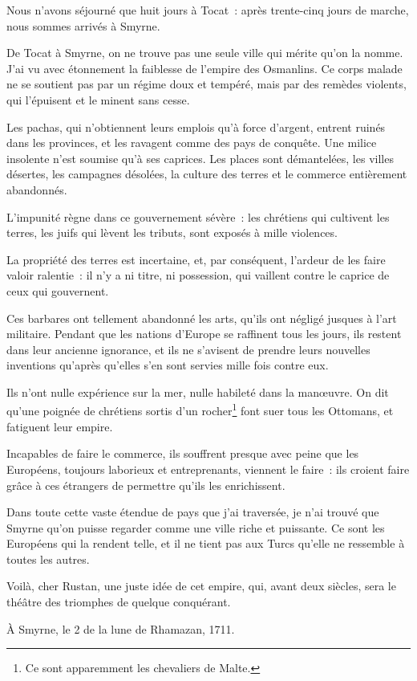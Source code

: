 \documentclass[french,twoside]{book} %
\begin{document}
\noindent Nous n’avons séjourné que huit jours à Tocat : après trente-cinq jours de marche, nous sommes arrivés à Smyrne.\par
De Tocat à Smyrne, on ne trouve pas une seule ville qui mérite qu’on la nomme. J’ai vu avec étonnement la faiblesse de l’empire des Osmanlins. Ce corps malade ne se soutient pas par un régime doux et tempéré, mais par des remèdes violents, qui l’épuisent et le minent sans cesse.\par
Les pachas, qui n’obtiennent leurs emplois qu’à force d’argent, entrent ruinés dans les provinces, et les ravagent comme des pays de conquête. Une milice insolente n’est soumise qu’à ses caprices. Les places sont démantelées, les villes désertes, les campagnes désolées, la culture des terres et le commerce entièrement abandonnés.\par
L’impunité règne dans ce gouvernement sévère : les chrétiens qui cultivent les terres, les juifs qui lèvent les tributs, sont exposés à mille violences.\par
La propriété des terres est incertaine, et, par conséquent, l’ardeur de les faire valoir ralentie : il n’y a ni titre, ni possession, qui vaillent contre le caprice de ceux qui gouvernent.\par
Ces barbares ont tellement abandonné les arts, qu’ils ont négligé jusques à l’art militaire. Pendant que les nations d’Europe se raffinent tous les jours, ils restent dans leur ancienne ignorance, et ils ne s’avisent de prendre leurs nouvelles inventions qu’après qu’elles s’en sont servies mille fois contre eux.\par
Ils n’ont nulle expérience sur la mer, nulle habileté dans la manœuvre. On dit qu’une poignée de chrétiens sortis d’un rocher\footnote{Ce sont apparemment les chevaliers de Malte.} font suer tous les Ottomans, et fatiguent leur empire.\par
Incapables de faire le commerce, ils souffrent presque avec peine que les Européens, toujours laborieux et entreprenants, viennent le faire : ils croient faire grâce à ces étrangers de permettre qu’ils les enrichissent.\par
Dans toute cette vaste étendue de pays que j’ai traversée, je n’ai trouvé que Smyrne qu’on puisse regarder comme une ville riche et puissante. Ce sont les Européens qui la rendent telle, et il ne tient pas aux Turcs qu’elle ne ressemble à toutes les autres.\par
Voilà, cher Rustan, une juste idée de cet empire, qui, avant deux siècles, sera le théâtre des triomphes de quelque conquérant.\par
À Smyrne, le 2 de la lune de Rhamazan, 1711.
\end{document}
